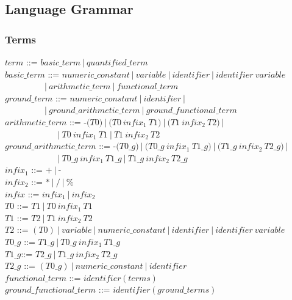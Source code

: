 \documentclass[a4paper,10pt]{article}
\begin{document}
\subsection{Language Grammar}


\subsubsection{Terms}


$term$ ::= $basic\_term~|~quantified\_term$ \\ 
$basic\_term$ ::= $numeric\_constant~|~variable~|~identifier~|~identifier~variable$ \\
$~~~~~~~~~~~~~~~~~~~~~|~arithmetic\_term~|~functional\_term$\\
$ground\_term$ ::= $numeric\_constant~|~identifier~|~$ \\
$~~~~~~~~~~~~~~~~~~~~~|~ground\_arithmetic\_term~|~ground\_functional\_term$\\
$arithmetic\_term$ ::= $\texttt{-(}T0\texttt{)}~|~ \texttt{(}T0~infix_1~T1\texttt{)}~|~\texttt{(}T1~infix_2~T2\texttt{)}~|~$ \\ $~~~~~~~~~~~~~~~~~~~~~~~~~~~~|~T0~infix_1~T1~|~T1~infix_2~T2$\\
$ground\_arithmetic\_term$ ::= $\texttt{-(}T0\_g\texttt{)}~|~ \texttt{(}T0\_g~infix_1~T1\_g\texttt{)}~|~\texttt{(}T1\_g~infix_2~T2\_g\texttt{)}~|~$ \\ $~~~~~~~~~~~~~~~~~~~~~~~~~~~~|~T0\_g~infix_1~T1\_g~|~T1\_g~infix_2~T2\_g$\\


\noindent
$infix_1$ ::= $ \texttt{+} ~|~ \texttt{-} $\\
$infix_2$ ::= $ \texttt{*} ~|~ \texttt{/}~|~\texttt{\%} $\\
$infix$ ::= $infix_1~|~infix_2$\\
$T0$ ::= $T1~|~T0~infix_1~T1$\\
$T1$ ::= $T2~|~T1~infix_2~T2$ \\
$T2$ ::= $(T0)~|~variable~|~numeric\_constant~|~identifier~|~identifier~variable$ \\

\noindent
$T0\_g$ ::= $T1\_g~|~T0\_g~infix_1~T1\_g$\\
$T1\_g$::= $T2\_g~|~T1\_g~infix_2~T2\_g$ \\
$T2\_g$ ::= $(T0\_g)~|~numeric\_constant~|~identifier$ \\

\noindent
$functional\_term$ ::= $identifier~\texttt{(}~terms~\texttt{)}~$\\
$ground\_functional\_term$ ::= $identifier~\texttt{(}~ground\_terms~\texttt{)}~$\\
\end{document}
